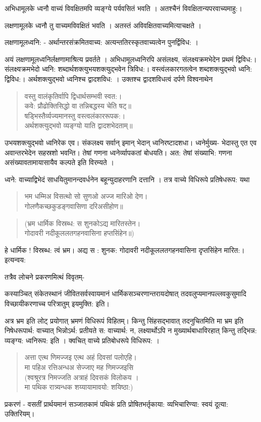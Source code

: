 {अभिधामूलके ध्वनौ वाच्यं विवक्षितमपि व्यङ्ग्ये पर्यवसितं भवति । अतश्चैनं विवक्षितान्यपरवाच्यमाहु:।

लक्षणामूलके ध्वनौ तु वाच्यमविवक्षितं भवति । अतस्तं अविवक्षितवाच्यमित्याचक्षते ।

लक्षणामूलध्वनि: - अर्थान्तरसंक्रमितवाच्य: अत्यन्ततिरस्कृतवाच्यत्वेन पुनर्द्विविध: ।

अयं लक्षणामूलध्वनिर्लक्षणामाश्रित्य प्रवर्तते । अभिधामूलध्वनिरपि असंलक्ष्य,  संलक्ष्यक्रमभेदेन प्रथमं द्विविध:।  संलक्ष्यक्रमभेदो ध्वनि: शब्दार्थशक्त्युभयशक्त्युद्भवेन त्रिविध:। वस्त्वंलकारगतत्वेन शब्दशक्त्युद्भवो ध्वनि: द्विविध:। अर्थशक्त्युद्भवो ध्वनिश्च द्वादशविध: । उक्तश्च द्वादशविधत्वं दर्पणे विश्वनाथेन

\begin{verse}
वस्तु वालंकृतिर्वापि द्विधार्थसम्भवी स्वत:।\\
कवे: प्रौढोक्तिसिद्धो वा तन्निबद्धस्य चेति षट्॥\\
षड्भिस्तैर्व्यज्यमानस्तु वस्त्वलंकाररूपक:।\\
अर्थशक्त्युद्भवो व्यङ्ग्यो याति द्वादशभेदताम्॥
\end{verse}
उभयशक्त्युद्भवो ध्वनिरेक एव। संकलक्ष्य सर्वान् इमान् भेदान् ध्वनिरष्टादशधा। ध्वनेर्मुख्य- भेदास्तु एत एव अवान्तरभेदेन सहस्रशो भवन्ति। तेषां गणना ध्वनेर्व्यापकतां बोधयति। अत: तेषां संख्याभि: गणना असंख्यावतामायासायैव कल्पते इति विरम्यते ।

ध्वने: वाच्याद्विभेदं साधयितुमानन्दवर्धनेन बहून्युदाहरणानि दत्तानि । तत्र वाच्ये विधिरूपे प्रतिषेधरूप: यथा 
\begin{verse}
भम धम्मिअ विसत्थो सो सुणओ अज्ज मारिओ देण।\\
गोलणैकच्छकुडङ्गवासिणा दरिअसीहोण॥
\end{verse}
\begin{verse}
(भ्रम धार्मिक विस्रब्ध: स शुनकोऽद्य मारितस्तेन।\\
गोदावरी नदीकूललतगहनवासिना हप्तसिंहेन॥)
\end{verse}
हे धार्मिक !  विस्रब्ध: त्वं भ्रम। अद्य स : शुनक: गोदावरी नदीकूललतगहनवासिना दृप्तसिंहेन मारित:। इत्यन्वय:

तत्रैव लोचने प्रकरणमित्थं विवृतम्-

कस्याञ्चित् संकेतस्थानं जीवितसर्वस्वायमानं धार्मिकसञ्चरणान्तरायदोषात् तदवलुप्यमानपल्लवकुसुमादि विच्छायीकरणाच्च परित्रातुम् इयमुक्ति: इति।

अत्र भ्रम इति लोट् प्रयोगात् भ्रमणं विधिरूपं विहितम्। किन्तु सिंहसद्भावात् तदनुचितमिति मा भ्रम इति निषेधरूपार्थ: वाच्यात् भिन्नोऽर्थ: प्रतीयते स: वाच्यार्थ: न, लक्ष्यार्थोऽपि न मुख्यार्थबाधाविरहात् किन्तु तद्भिन्न: व्यङ्ग्य: ध्वनिरूप: इति । क्वचित् वाच्ये प्रतिबोधरूपे विधिरूप: ।
\begin{verse}
अत्ता एत्थ णिमज्जइ एत्थ अहं दिवसां पलोएहि।\\
मा पहिअ रत्तिअन्धअ सेज्जाए मह णिमज्जइसि\\
(श्वश्रूरत्र निमज्जति अत्राहं दिवसकं विलोकय ।\\
मा पथिक रात्र्यन्धक शय्यायामावयो: शयिष्ठा:)
\end{verse}
प्रकरणं - वसतीं प्रार्थयमानं सञ्जातकामं पथिकं प्रति प्रोषितभर्तृकाया: व्यभिचारिण्या: स्वयं दूत्या: उक्तिरियम्।

}
